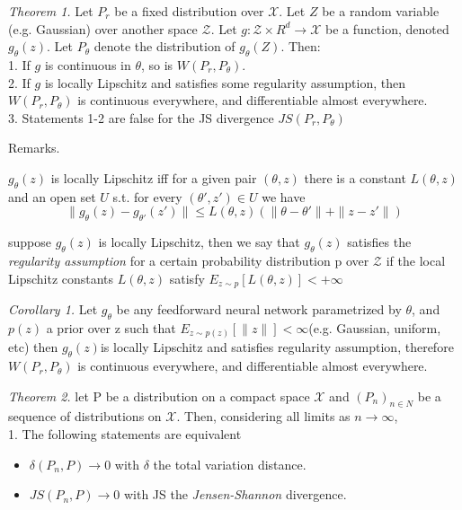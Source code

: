 \documentclass[english]{article}
\begin{document}
\item {\emph{Theorem 1.}}
 Let $P_r$ be a fixed distribution over $\mathcal{X}$. Let $Z$ be a random variable (e.g. Gaussian) over another space $\mathcal{Z}$. Let $g: \mathcal{Z}\times R^d \rightarrow \mathcal{X}$ be a function, denoted $g_\theta (z)$. Let $P_\theta$ denote the distribution of $g_\theta (Z)$. Then:\\
 1. If $g$ is continuous in $\theta$, so is $W(P_r,P_\theta)$.\\
 2. If $g$ is locally Lipschitz and satisfies some regularity assumption, then $W(P_r,P_\theta)$ is continuous everywhere, and differentiable almost everywhere.\\
 3. Statements 1-2 are false for the JS divergence $JS(P_r,P_\theta)$




\item {Remarks}.

\benum 
\item   $g_\theta(z)$ is locally Lipschitz iff for a given pair $(\theta, z)$ there is a constant $L(\theta, z)$ and an open set $U$ s.t. for every $(\theta', z')\in U$ we have $$\|g_{\theta} (z)-g_{\theta'}(z')\| \le L(\theta, z)(\|\theta-\theta'\|+\|z-z'\|) $$
\item   suppose $g_\theta(z)$ is locally Lipschitz, then we say that $g_\theta(z)$ satisfies the \emph{regularity assumption} for a certain probability distribution p over $\mathcal{Z}$ if the local Lipschitz constants $L(\theta, z)$ satisfy $E_{z\sim p} [L(\theta, z)]< +\infty$
\eenum





\item {\emph{Corollary 1.}}
 Let $g_\theta$ be any feedforward neural network parametrized by $\theta$, and $p(z)$ a prior over z such that $E_{z\sim p(z)}[\|z\|]<\infty$(e.g. Gaussian, uniform, etc) then $g_\theta(z)$is locally Lipschitz and satisfies regularity assumption, therefore $W(P_r,P_\theta)$ is continuous everywhere, and differentiable almost everywhere.
 





\item {\emph{Theorem 2.}}
 let P be a distribution on a compact space $\mathcal{X}$ and $(P_n)_{n\in N}$ be a sequence of distributions on $\mathcal{X}$. Then, considering all limits as $n \rightarrow \infty$, \\
 1. The following statements are equivalent 
 \begin{itemize}
  \item $\delta(P_n, P)\rightarrow 0$ with $\delta$ the total variation distance.
  \item $JS(P_n, P)\rightarrow 0$ with JS the \emph{Jensen-Shannon} divergence.
  \end{itemize}
\end{document}
